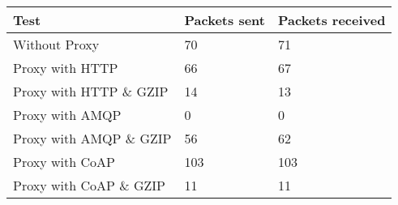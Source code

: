 \begin{tabular}{|l|l|l|}
\hline
\textbf{Test} & \textbf{Packets sent} & \textbf{Packets received} \\ \hline
Without Proxy                    &70         & 71        \\ \hline 
Proxy with HTTP                  &66         & 67        \\ \hline 
Proxy with HTTP \& GZIP          &14         & 13        \\ \hline 
Proxy with AMQP                  &0          & 0         \\ \hline 
Proxy with AMQP \& GZIP          &56         & 62        \\ \hline 
Proxy with CoAP                  &103        & 103       \\ \hline 
Proxy with CoAP \& GZIP          &11         & 11        \\ \hline 
\end{tabular}